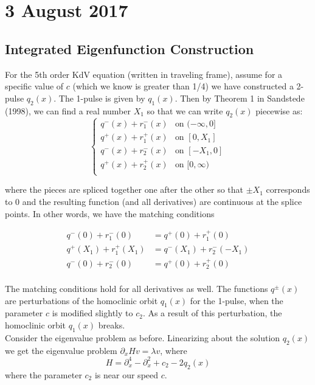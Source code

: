 \documentclass[12pt]{article}
\begin{document}
\section*{3 August 2017}

\subsection*{Integrated Eigenfunction Construction}
For the 5th order KdV equation (written in traveling frame), assume for a specific value of $c$ (which we know is greater than 1/4) we have constructed a 2-pulse $q_2(x)$. The 1-pulse is given by $q_1(x)$. Then by Theorem 1 in Sandstede (1998), we can find a real number $X_1$ so that we can write $q_2(x)$ piecewise as:
\begin{equation}\label{q2piecewise}
\begin{cases}
q^-(x) + r_1^-(x) & \text{on } (-\infty, 0] \\
q^+(x) + r_1^+(x) & \text{on } [0, X_1] \\
q^-(x) + r_2^-(x) & \text{on } [-X_1, 0] \\
q^+(x) + r_2^+(x) & \text{on } [0, \infty) \\ 
\end{cases}
\end{equation}

where the pieces are spliced together one after the other so that $\pm X_1$ corresponds to 0 and the resulting function (and all derivatives) are continuous at the splice points. In other words, we have the matching conditions

\begin{align*}
q^-(0) + r_1^-(0) &= q^+(0) + r_1^+(0) \\
q^+(X_1) + r_1^+(X_1) &= q^-(X_1) + r_2^-(-X_1) \\
q^-(0) + r_2^-(0) &= q^+(0) + r_2^+(0) \\
\end{align*}

The matching conditions hold for all derivatives as well. The functions $q^\pm(x)$ are perturbations of the homoclinic orbit $q_1(x)$ for the 1-pulse, when the parameter $c$ is modified slightly to $c_2$. As a result of this perturbation, the homoclinic orbit $q_1(x)$ breaks. \\

Consider the eigenvalue problem as before. Linearizing about the solution $q_2(x)$ we get the eigenvalue problem $\partial_x H v = \lambda v$, where 
\begin{equation}\label{hamiltonian}
H = \partial_x^4 - \partial_x^2 + c_2 - 2 q_2(x)
\end{equation}
where the parameter $c_2$ is near our speed $c$. \\
\end{document}
